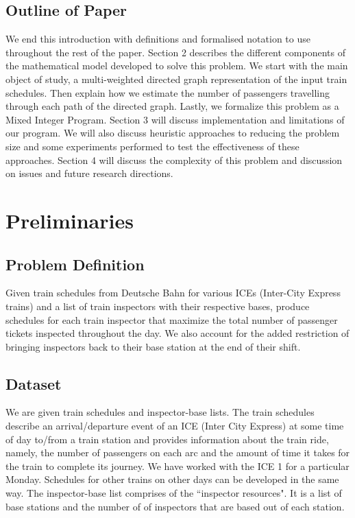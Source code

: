 \documentclass[11pt]{article}
\begin{document}
\subsection{Outline of Paper}
\par We end this introduction with definitions and formalised notation to use throughout the rest of the paper. Section 2 describes the different components of the mathematical model developed to solve this problem. We start with the main object of study, a multi-weighted directed graph representation of the input train schedules. Then explain how we estimate the number of passengers travelling through each path of the directed graph. Lastly, we formalize this problem as a Mixed Integer Program. Section 3 will discuss implementation and limitations of our program. We will also discuss heuristic approaches to reducing the problem size and some experiments performed to test the effectiveness of these approaches. Section 4 will discuss the complexity of this problem and discussion on issues and future research directions.

\section{Preliminaries}

\subsection{Problem Definition}

\par Given train schedules from Deutsche Bahn for various ICEs (Inter-City Express trains) and a list of train inspectors with their respective bases, produce schedules for each train inspector that maximize the total number of passenger tickets inspected throughout the day. We also account for the added restriction of bringing inspectors back to their base station at the end of their shift.

\subsection{Dataset}
\par We are given train schedules and inspector-base lists. The train schedules describe an arrival/departure event of an ICE (Inter City Express) at some time of day to/from a train station and provides information about the train ride, namely, the number of passengers on each arc and the amount of time it takes for the train to complete its journey. We have worked with the ICE 1 for a particular Monday. Schedules for other trains on other days can be developed in the same way. The inspector-base list comprises of the ``inspector resources". It is a list of base stations and the number of of inspectors that are based out of each station.
\end{document}
